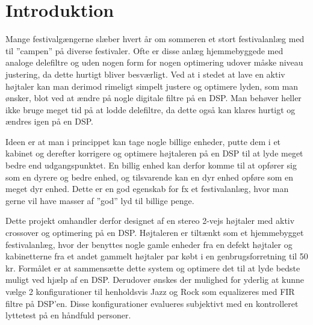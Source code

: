 \section{Introduktion}

Mange festivalgængerne slæber hvert år om sommeren et stort festivalanlæg med til ”campen” på diverse festivaler. Ofte er disse anlæg hjemmebyggede med analoge delefiltre og uden nogen form for nogen optimering udover måske niveau justering, da dette hurtigt bliver besværligt. Ved at i stedet at lave en aktiv højtaler kan man derimod rimeligt simpelt justere og optimere lyden, som man ønsker, blot ved at ændre på nogle digitale filtre på en DSP. Man behøver heller ikke bruge meget tid på at lodde delefiltre, da dette også kan klares hurtigt og ændres igen på en DSP. 

Ideen er at man i princippet kan tage nogle billige enheder, putte dem i et kabinet og derefter korrigere og optimere højtaleren på en DSP til at lyde meget bedre end udgangspunktet. En billig enhed kan derfor komme til at opfører sig som en dyrere og bedre enhed, og tilsvarende kan en dyr enhed opføre som en meget dyr enhed. Dette er en god egenskab for fx et festivalanlæg, hvor man gerne vil have masser af ”god” lyd til billige penge.  

Dette projekt omhandler derfor designet af en stereo 2-vejs højtaler med aktiv crossover og optimering på en DSP. Højtaleren er tiltænkt som et hjemmebygget festivalanlæg, hvor der benyttes nogle gamle enheder fra en defekt højtaler og kabinetterne fra et andet gammelt højtaler par købt i en genbrugsforretning til 50 kr. Formålet er at sammensætte dette system og optimere det til at lyde bedste muligt ved hjælp af en DSP. Derudover ønskes der mulighed for yderlig at kunne vælge 2 konfigurationer til henholdsvis Jazz og Rock som equalizeres med FIR filtre på DSP’en. Disse konfigurationer evalueres subjektivt med en kontrolleret lyttetest på en håndfuld personer.
